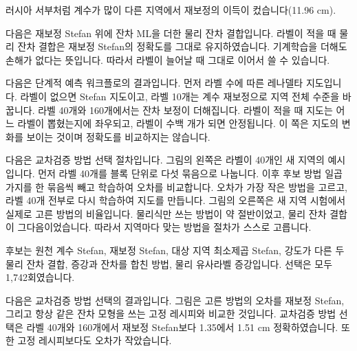 \begin{optbox}
러시아 서부처럼 계수가 많이 다른 지역에서 재보정의 이득이 컸습니다(11.96 cm).
\end{optbox}


다음은 재보정 Stefan 위에 잔차 ML을 더한 물리 잔차 결합입니다. 라벨이 적을 때 물리 잔차 결합은 재보정 Stefan의 정확도를 그대로 유지하였습니다. 기계학습을 더해도 손해가 없다는 뜻입니다. 따라서 라벨이 늘어날 때 그대로 이어서 쓸 수 있습니다.



다음은 단계적 예측 워크플로의 결과입니다. 먼저 라벨 수에 따른 레나델타 지도입니다. 라벨이 없으면 Stefan 지도이고, 라벨 10개는 계수 재보정으로 지역 전체 수준을 바꿉니다. 라벨 40개와 160개에서는 잔차 보정이 더해집니다. 라벨이 적을 때 지도는 어느 라벨이 뽑혔는지에 좌우되고, 라벨이 수백 개가 되면 안정됩니다. 이 쪽은 지도의 변화를 보이는 것이며 정확도를 비교하지는 않습니다.



다음은 교차검증 방법 선택 절차입니다. 그림의 왼쪽은 라벨이 40개인 새 지역의 예시입니다. 먼저 라벨 40개를 블록 단위로 다섯 묶음으로 나눕니다. 이후 후보 방법 일곱 가지를 한 묶음씩 빼고 학습하여 오차를 비교합니다. 오차가 가장 작은 방법을 고르고, 라벨 40개 전부로 다시 학습하여 지도를 만듭니다. 그림의 오른쪽은 새 지역 시험에서 실제로 고른 방법의 비율입니다. 물리식만 쓰는 방법이 약 절반이었고, 물리 잔차 결합이 그다음이었습니다. 따라서 지역마다 맞는 방법을 절차가 스스로 고릅니다.


\begin{optbox}
후보는 원천 계수 Stefan, 재보정 Stefan, 대상 지역 최소제곱 Stefan, 강도가 다른 두 물리 잔차 결합, 증강과 잔차를 합친 방법, 물리 유사라벨 증강입니다. 선택은 모두 1,742회였습니다.
\end{optbox}


다음은 교차검증 방법 선택의 결과입니다. 그림은 고른 방법의 오차를 재보정 Stefan, 그리고 항상 같은 잔차 모형을 쓰는 고정 레시피와 비교한 것입니다. 교차검증 방법 선택은 라벨 40개와 160개에서 재보정 Stefan보다 1.35에서 1.51 cm 정확하였습니다. 또한 고정 레시피보다도 오차가 작았습니다.

